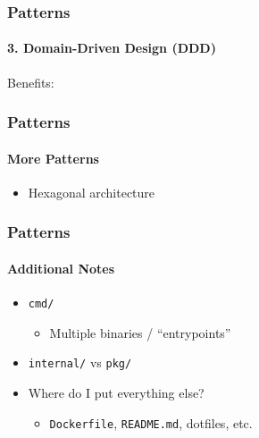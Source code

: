 \begin{frame}[fragile]
  \frametitle{Patterns}
  \framesubtitle{3. Domain-Driven Design (DDD)}

  Benefits:
\end{frame}

\begin{frame}[fragile]
  \frametitle{Patterns}
  \framesubtitle{More Patterns}

  \begin{itemize}
    \item Hexagonal architecture
  \end{itemize}
\end{frame}

\begin{frame}[fragile]
  \frametitle{Patterns}
  \framesubtitle{Additional Notes}

  \begin{itemize}
    \item \texttt{cmd/}
      \begin{itemize}
        \item Multiple binaries / ``entrypoints''
      \end{itemize}
    \item \texttt{internal/} vs \texttt{pkg/}
    \item Where do I put everything else?
      \begin{itemize}
        \item \texttt{Dockerfile}, \texttt{README.md}, dotfiles, etc.
      \end{itemize}
  \end{itemize}
\end{frame}
